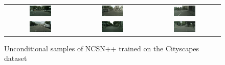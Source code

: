 \begin{figure} \label{fig:5.10}
    \tiny
    \centering
    \setlength\tabcolsep{-2pt}
    \begin{tabular}{ccc}
        \includegraphics[width=0.33\textwidth]{Chapters/figures/experiments/cityscapes/1_uncond_sample.png} & 
        \includegraphics[width=0.33\textwidth]{Chapters/figures/experiments/cityscapes/3_uncond_sample.png} & 
        \includegraphics[width=0.33\textwidth]{Chapters/figures/experiments/cityscapes/8_uncond_sample.png}\\
        \includegraphics[width=0.33\textwidth]{Chapters/figures/experiments/cityscapes/6_uncond_sample.png} & 
        \includegraphics[width=0.33\textwidth]{Chapters/figures/experiments/cityscapes/10_uncond_sample.png} & 
        \includegraphics[width=0.33\textwidth]{Chapters/figures/experiments/cityscapes/18_uncond_sample.png} \\
    \end{tabular}
    \caption{Unconditional samples of NCSN++ trained on the Cityscapes dataset}
\end{figure}
%

